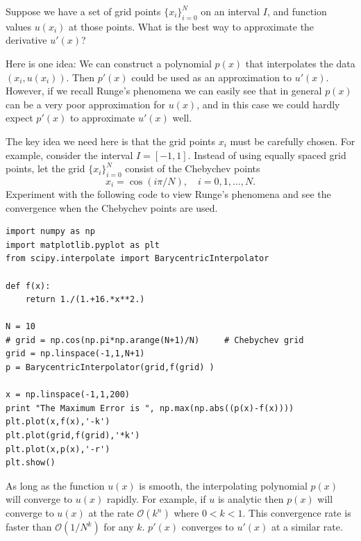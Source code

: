 \label{lab:pseudospectral1}

Suppose we have a set of grid points $\{x_i\}_{i=0}^N$ on an interval $I$, and function values $u(x_i)$ at those points.
What is the best way to approximate the derivative $u'(x)$?

Here is one idea: We can construct a polynomial $p(x)$ that interpolates the data $(x_i,u(x_i))$.
Then $p'(x)$ could be used as an approximation to $u'(x)$.
However, if we recall Runge's phenomena we can easily see that in general $p(x)$ can be a very poor approximation for $u(x)$, and in this case we could hardly expect $p'(x)$ to approximate $u'(x)$ well. 

The key idea we need here is that the grid points $x_i$ must be carefully chosen.
For example, consider the interval $I = [-1,1]$.
Instead of using equally spaced grid points, let the grid $\{x_i\}_{i=0}^N$ consist of the Chebychev points 
\[x_i = \cos (i \pi /N), \quad i = 0, 1, \ldots, N.\]
Experiment with the following code to view Runge's phenomena and see the convergence when the Chebychev points are used.

\begin{lstlisting}
import numpy as np
import matplotlib.pyplot as plt
from scipy.interpolate import BarycentricInterpolator

def f(x):
	return 1./(1.+16.*x**2.)

N = 10
# grid = np.cos(np.pi*np.arange(N+1)/N)		# Chebychev grid
grid = np.linspace(-1,1,N+1)
p = BarycentricInterpolator(grid,f(grid) )

x = np.linspace(-1,1,200)
print "The Maximum Error is ", np.max(np.abs((p(x)-f(x))))
plt.plot(x,f(x),'-k')
plt.plot(grid,f(grid),'*k')
plt.plot(x,p(x),'-r')
plt.show()
\end{lstlisting}

As long as the function $u(x)$ is smooth, the interpolating polynomial $p(x)$ will converge to $u(x)$ rapidly.
For example, if $u$ is analytic then $p(x)$ will converge to $u(x)$ at the rate $\mathcal{O}(k^n)$ where $0<k<1$.
This convergence rate is faster than $\mathcal{O}(1/N^k)$ for any $k$. $p'(x)$ converges to $u'(x)$ at a similar rate. 

